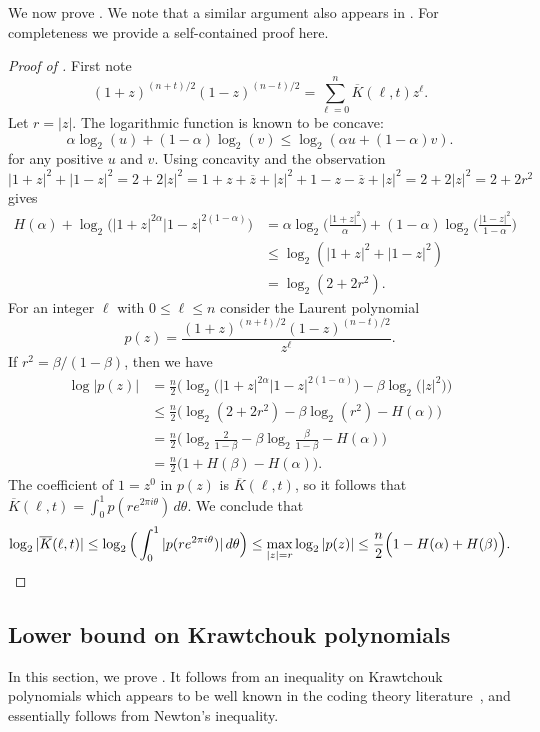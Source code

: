 \documentclass[10pt,a4paper]{article}
\theoremstyle{definition}
\newcommand{\ol}[1]{\overline{#1}}
\def\sK{\ol{K}}
\begin{document}
We now prove .
We note that a similar argument also appears in \cite[Lemma 2.1]{Pol19}.
For completeness we provide a self-contained proof here.
\begin{proof}[Proof of ]
First note
$$
(1+z)^{(n+t)/2}(1-z)^{(n-t)/2}=\sum_{\ell=0}^n
\sK(\ell,t)z^\ell.
$$
Let $r=|z|$. The logarithmic function is known to be concave: 
\[
  \alpha\log_2(u)+(1-\alpha)\log_2(v)\leq \log_2(\alpha u+(1-\alpha) v).
\]
for any positive $u$ and $v$.
Using concavity and the observation   $|1+z|^2+|1-z|^2=2+2|z|^2=1+z+\overline{z}+|z|^2+1-z-\overline{z}+|z|^2=2+2|z|^2=2+2r^2$ gives 
\begin{align*}
  H(\alpha)+\log_2\big(|1+z|^{2\alpha}|1-z|^{2(1-\alpha)}\big)
  &= \alpha\log_2\Big(\frac{|1+z|^2}{\alpha}\Big) + (1-\alpha)\log_2\Big(\frac{|1-z|^2}{1-\alpha}\Big) \\
  &\le \log_2(|1+z|^2+|1-z|^2) \\
  &=\log_2(2+2r^2) .
\end{align*}
For an integer $\ell$ with $0\leq \ell\leq n$
consider the Laurent polynomial 
$$
p(z)=\frac{(1+z)^{(n+t)/2}(1-z)^{(n-t)/2}}{z^\ell}.
$$
If $r^2=\beta/(1-\beta)$, then we have
\begin{align*}
  \log|p(z)|
  &= \frac{n}{2}\Big(\log_2\big(|1+z|^{2\alpha}|1-z|^{2(1-\alpha)}\big)-\beta\log_2\big(|z|^2\big)\Big) \\
  &\leq \frac{n}{2}\Big(\log_2(2+2r^2)-\beta\log_2(r^2)-H(\alpha)\Big) \\
  &= \frac{n}{2}\Big(\log_2\tfrac{2}{1-\beta}-
\beta\log_2\tfrac{\beta}{1-\beta} - H(\alpha)\Big) \\
  &= \frac{n}{2}\Big(1+H(\beta)-H(\alpha)\Big) .
\end{align*}
The coefficient of $1=z^0$ in $p(z)$ is $\sK(\ell,t)$, so it follows that
$\sK(\ell,t)=\int_0^1p(re^{2\pi i \theta})\,d\theta$. We conclude that
\[
\log_2|\sK(\ell,t)|
\le \log_2\Big(\int_0^1 |p(re^{2\pi i\theta})|\,d\theta\Big)
\le \max_{|z|=r}\log_2 |p(z)|
\le\frac{n}{2}\Big(1-H(\alpha)+H(\beta)\Big). \qedhere
\]
\end{proof}

\subsection{Lower bound on Krawtchouk polynomials}

In this section, we prove .
It follows from an inequality on Krawtchouk polynomials which appears to be well known in the coding theory literature~\cite{MRRW77,KL95,Kra01,KS21}, and essentially follows from Newton's inequality.
\end{document}

